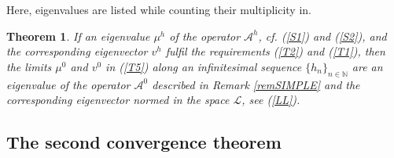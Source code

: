 \documentclass[11pt]{article}%
\newtheorem{theorem}{Theorem}
\numberwithin{equation}{section}
\begin{document}
Here, eigenvalues are listed while counting their multiplicity in.

\begin{theorem}
\label{th1T}If an eigenvalue $\mu^{h}$ of the operator $\mathcal{A}^{h}$, cf.
(\ref{S1}) and (\ref{S2}), and the corresponding eigenvector $v^{h}$ fulfil
the requirements (\ref{T2}) and (\ref{T1}), then the limits $\mu^{0}$ and
$v^{0}$ in (\ref{T5}) along an infinitesimal sequence $\{h_{n}\}_{n\in
\mathbb{N}}$ are an eigenvalue of the operator $\mathcal{A}^{0}$ described in
Remark \ref{remSIMPLE} and the corresponding eigenvector normed in the space
$\mathcal{L}$, see (\ref{LL}).
\end{theorem}

\subsection{The second convergence theorem\label{sect4.2}}
\end{document}
